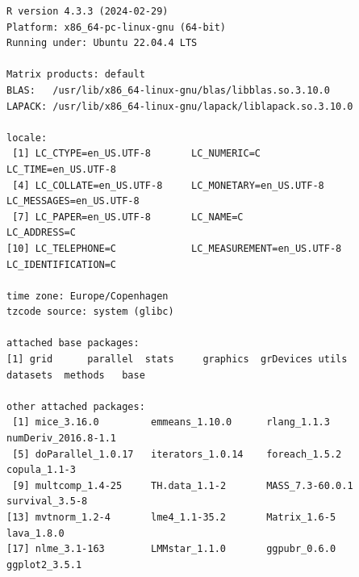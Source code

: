\documentclass[12pt]{article}
\begin{document}
\label{}
\begin{verbatim}
R version 4.3.3 (2024-02-29)
Platform: x86_64-pc-linux-gnu (64-bit)
Running under: Ubuntu 22.04.4 LTS

Matrix products: default
BLAS:   /usr/lib/x86_64-linux-gnu/blas/libblas.so.3.10.0 
LAPACK: /usr/lib/x86_64-linux-gnu/lapack/liblapack.so.3.10.0

locale:
 [1] LC_CTYPE=en_US.UTF-8       LC_NUMERIC=C               LC_TIME=en_US.UTF-8       
 [4] LC_COLLATE=en_US.UTF-8     LC_MONETARY=en_US.UTF-8    LC_MESSAGES=en_US.UTF-8   
 [7] LC_PAPER=en_US.UTF-8       LC_NAME=C                  LC_ADDRESS=C              
[10] LC_TELEPHONE=C             LC_MEASUREMENT=en_US.UTF-8 LC_IDENTIFICATION=C       

time zone: Europe/Copenhagen
tzcode source: system (glibc)

attached base packages:
[1] grid      parallel  stats     graphics  grDevices utils     datasets  methods   base     

other attached packages:
 [1] mice_3.16.0         emmeans_1.10.0      rlang_1.1.3         numDeriv_2016.8-1.1
 [5] doParallel_1.0.17   iterators_1.0.14    foreach_1.5.2       copula_1.1-3       
 [9] multcomp_1.4-25     TH.data_1.1-2       MASS_7.3-60.0.1     survival_3.5-8     
[13] mvtnorm_1.2-4       lme4_1.1-35.2       Matrix_1.6-5        lava_1.8.0         
[17] nlme_3.1-163        LMMstar_1.1.0       ggpubr_0.6.0        ggplot2_3.5.1      


\end{verbatim}
\end{document}
